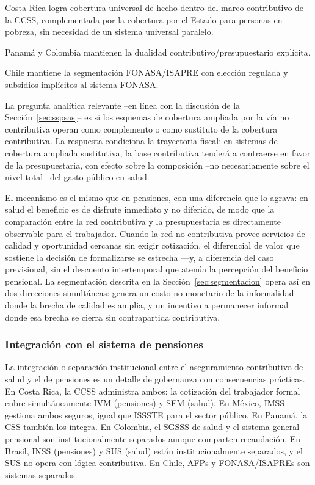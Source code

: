 \documentclass[12pt, letterpaper]{article}
\begin{document}
Costa Rica logra cobertura universal de hecho dentro del marco contributivo de la
CCSS, complementada por la cobertura por el Estado para personas en pobreza, sin
necesidad de un sistema universal paralelo.

Panamá y Colombia mantienen la dualidad contributivo/presupuestario explícita.

Chile mantiene la segmentación FONASA/ISAPRE con elección regulada y subsidios
implícitos al sistema FONASA.

La pregunta analítica relevante --en línea con la discusión de la
Sección~\ref{sec:sspsas}-- es si los esquemas de cobertura ampliada por la vía no contributiva
operan como complemento o como sustituto de la cobertura contributiva. La
respuesta condiciona la trayectoria fiscal: en sistemas de cobertura ampliada
sustitutiva, la base contributiva tenderá a contraerse en favor de la
presupuestaria, con efecto sobre la composición --no necesariamente sobre el
nivel total-- del gasto público en salud.

El mecanismo es el mismo que en pensiones, con una diferencia que lo agrava: en
salud el beneficio es de disfrute inmediato y no diferido, de modo que la
comparación entre la red contributiva y la presupuestaria es directamente
observable para el trabajador. Cuando la red no contributiva provee servicios de
calidad y oportunidad cercanas sin exigir cotización, el diferencial de valor que
sostiene la decisión de formalizarse se estrecha ---y, a diferencia del caso
previsional, sin el descuento intertemporal que atenúa la percepción del beneficio
pensional. La segmentación descrita en la Sección~\ref{sec:segmentacion} opera así en dos
direcciones simultáneas: genera un costo no monetario de la informalidad donde la
brecha de calidad es amplia, y un incentivo a permanecer informal donde esa brecha
se cierra sin contrapartida contributiva.

\subsubsection{Integración con el sistema de pensiones}

La integración o separación institucional entre el aseguramiento contributivo de
salud y el de pensiones es un detalle de gobernanza con consecuencias prácticas.
En Costa Rica, la CCSS administra ambos: la cotización del trabajador formal cubre
simultáneamente IVM (pensiones) y SEM (salud). En México, IMSS gestiona ambos
seguros, igual que ISSSTE para el sector público. En Panamá, la CSS también los
integra. En Colombia, el SGSSS de salud y el sistema general pensional son
institucionalmente separados aunque comparten recaudación. En Brasil, INSS
(pensiones) y SUS (salud) están institucionalmente separados, y el SUS no opera con
lógica contributiva. En Chile, AFPs y FONASA/ISAPREs son sistemas separados.
\end{document}
